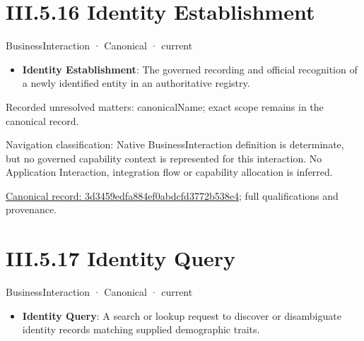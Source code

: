 \section*{III.5.16 Identity Establishment}
\label{navigation:III.5.16}

\label{element:3d3459edfa884ef0abdcfd3772b538e4}
{\small BusinessInteraction · Canonical · current}\par

\begin{itemize}


\item \textbf{Identity Establishment}: The governed recording and official recognition of a newly identified entity in an authoritative registry.

\end{itemize}

{\small Recorded unresolved matters: canonicalName; exact scope remains in the canonical record.}\par
{\small Navigation classification: Native BusinessInteraction definition is determinate, but no governed capability context is represented for this interaction. No Application Interaction, integration flow or capability allocation is inferred.}\par
{\footnotesize \href{../../../../continuum/business/business-interaction/3d3459edfa884ef0abdcfd3772b538e4.md}{Canonical record: 3d3459edfa884ef0abdcfd3772b538e4}; full qualifications and provenance.}\par
\section*{III.5.17 Identity Query}
\label{navigation:III.5.17}

\label{element:d119aa62e95f4d7aa01822401ca4203c}
{\small BusinessInteraction · Canonical · current}\par

\begin{itemize}


\item \textbf{Identity Query}: A search or lookup request to discover or disambiguate identity records matching supplied demographic traits.

\end{itemize}

